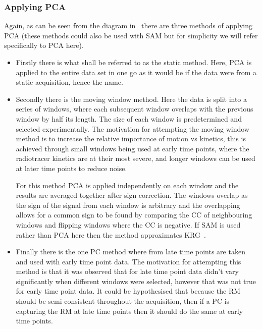                 \subsubsection{Applying PCA} \label{sec:pca_data_driven_surrogate_signal_extraction_methods_for_dynamic_pet_methods_applying_pca}
                    Again, as can be seen from the diagram in~ there are three methods of applying \gls{PCA} (these methods could also be used with \gls{SAM} but for simplicity we will refer specifically to \gls{PCA} here).
                    
                    \begin{itemize}
                        \item Firstly there is what shall be referred to as the static method. Here, \gls{PCA} is applied to the entire data set in one go as it would be if the data were from a static acquisition, hence the name.
                        
                        \item Secondly there is the moving window method. Here the data is split into a series of windows, where each subsequent window overlaps with the previous window by half its length. The size of each window is predetermined and selected experimentally. The motivation for attempting the moving window method is to increase the relative importance of motion vs kinetics, this is achieved through small windows being used at early time points, where the radiotracer kinetics are at their most severe, and longer windows can be used at later time points to reduce noise.
                        
                        For this method \gls{PCA} is applied independently on each window and the results are averaged together after sign correction. The windows overlap as the sign of the signal from each window is arbitrary and the overlapping allows for a common sign to be found by comparing the \gls{CC} of neighbouring windows and flipping windows where the \gls{CC} is negative. If \gls{SAM} is used rather than \gls{PCA} here then the method approximates \gls{KRG}~.

                        \item Finally there is the one \gls{PC} method where  from late time points are taken and used with early time point data. The motivation for attempting this method is that it was observed that  for late time point data didn't vary significantly when different windows were selected, however that was not true for early time point data. It could be hypothesised that because the \gls{RM} should be semi-consistent throughout the acquisition, then if a \gls{PC} is capturing the \gls{RM} at late time points then it should do the same at early time points.
                        

\end{itemize}

